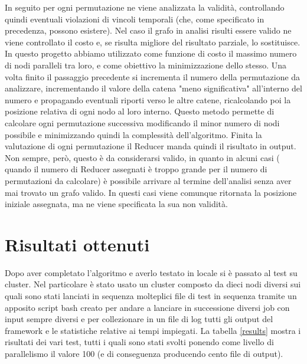 \documentclass[]{IEEEtran}
\begin{document}
In seguito per ogni permutazione ne viene analizzata la validità, controllando quindi eventuali violazioni di vincoli temporali (che, come specificato in precedenza, possono esistere). Nel caso il grafo in analisi risulti essere valido ne viene controllato il costo e, se risulta migliore del risultato parziale, lo sostituisce. 
In questo progetto abbiamo utilizzato come funzione di costo il massimo numero di nodi paralleli tra loro, e come obiettivo la minimizzazione dello stesso.
Una volta finito il passaggio precedente si incrementa il numero della permutazione da analizzare, incrementando il valore della catena "meno significativa" all'interno del numero e propagando eventuali riporti verso le altre catene, ricalcolando poi la posizione relativa di ogni nodo al loro interno.
Questo metodo permette di calcolare ogni permutazione successiva modificando il minor numero di nodi possibile e minimizzando quindi la complessità dell'algoritmo.
Finita la valutazione di ogni permutazione il Reducer manda quindi il risultato in output.
Non sempre, però, questo è da considerarsi valido, in quanto in alcuni casi ( quando il numero di Reducer assegnati è troppo grande per il numero di permutazioni da calcolare) è possibile arrivare al termine dell'analisi senza aver mai trovato un grafo valido. In questi casi viene comunque ritornata la posizione iniziale assegnata, ma ne viene specificata la sua non validità.

\section{Risultati ottenuti}
Dopo aver completato l'algoritmo e averlo testato in locale si è passato al test su cluster. 
Nel particolare è stato usato un cluster composto da dieci nodi diversi sui quali sono stati lanciati in sequenza molteplici file di test in sequenza tramite un apposito script bash creato per andare a lanciare in successione diversi job con input sempre diversi e per collezionare in un file di log tutti gli output del framework e le statistiche relative ai tempi impiegati. La tabella \ref{results} mostra i risultati dei vari test, tutti i quali sono stati svolti ponendo come livello di parallelismo il valore 100 (e di conseguenza producendo cento file di output).
\end{document}
